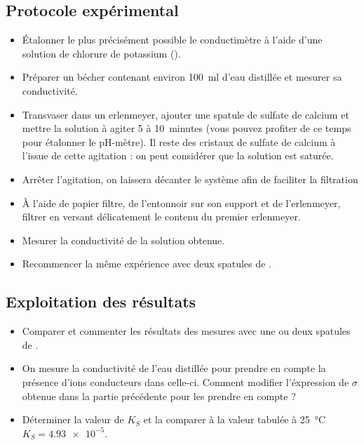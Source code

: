 \documentclass{tp}
\begin{document}
\subsection{Protocole expérimental}%
\label{sub:protocole_experimental}
\begin{itemize}
  \item Étalonner le plus précisément possible le conductimètre à l'aide d'une solution de chlorure de potassium ().

  \item Préparer un bécher contenant environ \SI{100}{\milli\litre} d'eau distillée et mesurer sa conductivité.

  \item Transvaser dans un erlenmeyer, ajouter une spatule de sulfate de calcium et mettre la solution à agiter 5 à 10~minutes (vous pouvez profiter de ce temps pour étalonner le pH-mètre). Il reste des cristaux de sulfate de calcium à l'issue de cette agitation : on peut considérer que la solution est saturée.

  \item Arrêter l'agitation, on laissera décanter le système afin de faciliter la filtration

  \item À l'aide de papier filtre, de l'entonnoir sur son support et de l'erlenmeyer, filtrer en versant délicatement le contenu du premier erlenmeyer.

  \item Mesurer la conductivité de la solution obtenue.

  \item Recommencer la même expérience avec deux spatules de .
\end{itemize}

\subsection{Exploitation des résultats}%
\label{sub:exploitation_des_resultats}
\begin{itemize}
\item Comparer et commenter les résultats des mesures avec une ou deux spatules de .

\item On mesure la conductivité de l'eau distillée pour prendre en compte la présence d'ions conducteurs dans celle-ci. Comment modifier l'éxpression de $\sigma$ obtenue dans la partie précédente pour les prendre en compte ?

\item Déterminer la valeur de $K_S$ et la comparer à la valeur tabulée à \SI{25}{\celsius} $K_S=\num{4.93e-5}$. 
\end{itemize}
\end{document}
